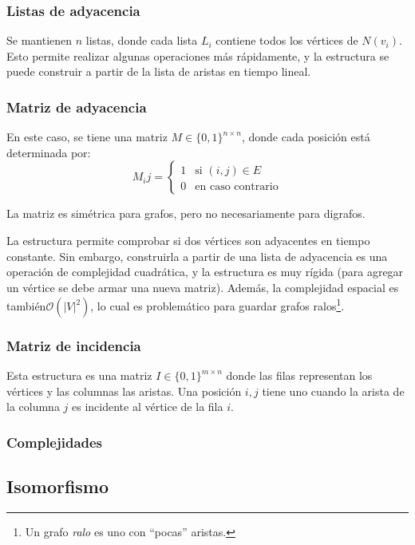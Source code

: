 \documentclass[a4paper]{report}
\newcommand{\BigO}[1]{\ensuremath{\mathcal{O}(#1)}}
\newcommand{\si}{\text{si }}
\newcommand{\ecc}{\text{en caso contrario}}
\begin{document}
\subsubsection{Listas de adyacencia}

Se mantienen $n$ listas, donde cada lista $L_i$ contiene todos los vértices de $N(v_i)$. Esto permite realizar algunas operaciones más rápidamente, y la estructura se puede construir a partir de la lista de aristas en tiempo lineal.

\subsubsection{Matriz de adyacencia}

En este caso, se tiene una matriz $M \in \{0, 1\}^{n \times n}$, donde cada posición está determinada por:
$$
    M_ij =
    \begin{cases}
        1 & \si (i, j) \in E \\
        0 & \ecc
    \end{cases}
$$

La matriz es simétrica para grafos, pero no necesariamente para digrafos.

La estructura permite comprobar si dos vértices son adyacentes en tiempo constante. Sin embargo, construirla a partir de una lista de adyacencia es una operación de complejidad cuadrática, y la estructura es muy rígida (para agregar un vértice se debe armar una nueva matriz). Además, la complejidad espacial es también\BigO{|V|^2}, lo cual es problemático para guardar grafos ralos\footnote{Un grafo \textit{ralo} es uno con ``pocas'' aristas.}.

\subsubsection{Matriz de incidencia}

Esta estructura es una matriz $I \in \{0, 1\}^{m \times n}$ donde las filas representan los vértices y las columnas las aristas. Una posición $i, j$ tiene uno cuando la arista de la columna $j$ es incidente al vértice de la fila $i$.

\subsubsection{Complejidades}


\subsection{Isomorfismo}
\end{document}
